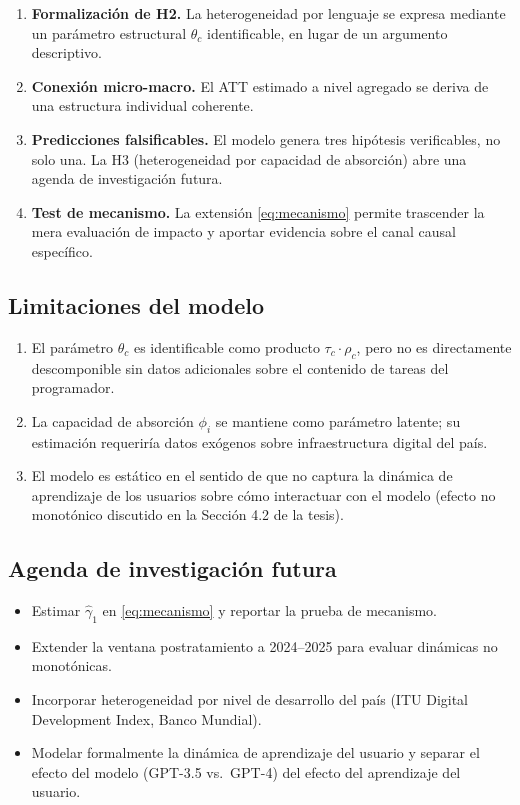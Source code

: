 \documentclass[11pt,a4paper]{article}
\theoremstyle{definition}
\begin{document}
\begin{enumerate}[leftmargin=*]
  \item \textbf{Formalización de H2.} La heterogeneidad por lenguaje se expresa mediante un parámetro estructural $\theta_c$ identificable, en lugar de un argumento descriptivo.
  \item \textbf{Conexión micro-macro.} El ATT estimado a nivel agregado se deriva de una estructura individual coherente.
  \item \textbf{Predicciones falsificables.} El modelo genera tres hipótesis verificables, no solo una. La H3 (heterogeneidad por capacidad de absorción) abre una agenda de investigación futura.
  \item \textbf{Test de mecanismo.} La extensión \eqref{eq:mecanismo} permite trascender la mera evaluación de impacto y aportar evidencia sobre el canal causal específico.
\end{enumerate}

\subsection{Limitaciones del modelo}

\begin{enumerate}[leftmargin=*]
  \item El parámetro $\theta_c$ es identificable como producto $\tau_c \cdot \rho_c$, pero no es directamente descomponible sin datos adicionales sobre el contenido de tareas del programador.
  \item La capacidad de absorción $\phi_i$ se mantiene como parámetro latente; su estimación requeriría datos exógenos sobre infraestructura digital del país.
  \item El modelo es estático en el sentido de que no captura la dinámica de aprendizaje de los usuarios sobre cómo interactuar con el modelo (efecto no monotónico discutido en la Sección 4.2 de la tesis).
\end{enumerate}

\subsection{Agenda de investigación futura}

\begin{itemize}[leftmargin=*]
  \item Estimar $\hat{\gamma}_1$ en \eqref{eq:mecanismo} y reportar la prueba de mecanismo.
  \item Extender la ventana postratamiento a 2024--2025 para evaluar dinámicas no monotónicas.
  \item Incorporar heterogeneidad por nivel de desarrollo del país (ITU Digital Development Index, Banco Mundial).
  \item Modelar formalmente la dinámica de aprendizaje del usuario y separar el efecto del modelo (GPT-3.5 vs.\ GPT-4) del efecto del aprendizaje del usuario.
\end{itemize}
\end{document}
